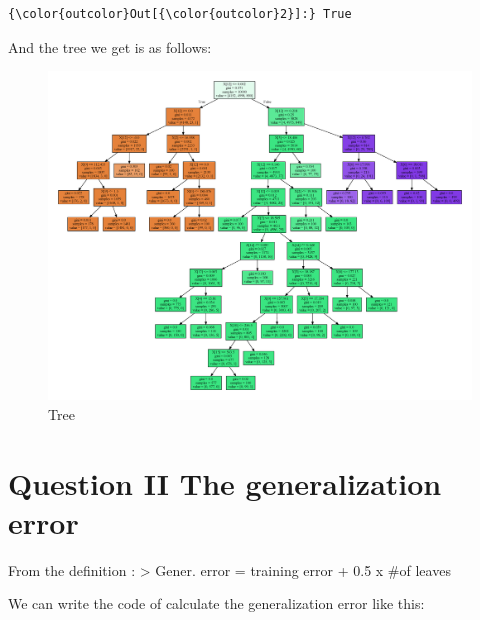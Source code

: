 \documentclass[11pt]{article}
\makeatletter
\def\maxwidth{\ifdim\Gin@nat@width>\linewidth\linewidth
    \else\Gin@nat@width\fi}
\let\Oldincludegraphics\includegraphics
\renewcommand{\includegraphics}[1]{\Oldincludegraphics[width=.8\maxwidth]{#1}}
\makeatother
\begin{document}
\begin{Verbatim}[commandchars=\\\{\}]
{\color{outcolor}Out[{\color{outcolor}2}]:} True
\end{Verbatim}
            
    And the tree we get is as follows:

    \begin{figure}
\centering
\includegraphics{img/Tree.png}
\caption{Tree}
\end{figure}

    \section{Question II The generalization
error}\label{question-ii-the-generalization-error}

    From the definition : \textgreater{} Gener. error = training error + 0.5
x \#of leaves

    We can write the code of calculate the generalization error like this:
\end{document}
